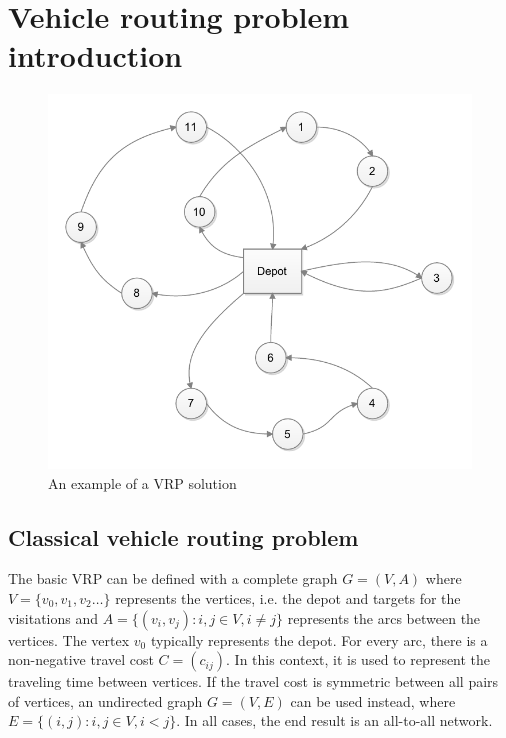 \chapter{Vehicle routing problem introduction}
\label{chapter:background} 

\begin{figure}[h]
  \begin{center}
    \includegraphics{images/vrpbasic.pdf}
    \caption{An example of a VRP solution}
    \label{fig:simplenetwork}
  \end{center}
\end{figure}

\section{Classical vehicle routing problem}



The basic VRP can be defined with a complete graph $G = (V, A)$ where $V = \{v_0, v_1, v_2 \dots\}$ represents the vertices, i.e. the depot and targets for the visitations and $A = \{(v_i, v_j): i, j \in V, i \neq j \}$ represents the arcs between the vertices. The vertex $v_0$ typically represents the depot. For every arc, there is a non-negative travel cost $C=(c_{ij})$. In this context, it is used to represent the traveling time between vertices. If the travel cost is symmetric between all pairs of vertices, an undirected graph $G = (V, E)$ can be used instead, where $E=\{(i, j) : i, j \in V, i < j\}$. In all cases, the end result is an all-to-all network. \cite{laporte2007you} 

